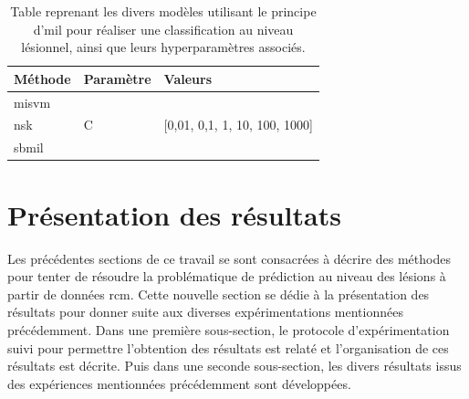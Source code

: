 \begin{table}[H]
    \centering
    \begin{tabular}{lll}
    \toprule
    \textbf{Méthode}    & \textbf{Paramètre}& \textbf{Valeurs}                                  \\ \midrule
    \gls{misvm}         & \multirow{3}{*}{C}& \multirow{3}{*}{[0,01, 0,1, 1, 10, 100, 1000]}    \\ \cline{1-1}
    \gls{nsk}           &                   &                                                   \\ \cline{1-1} 
    \gls{sbmil}         &                   &                                                   \\ \bottomrule 
    \end{tabular}    
    \caption{Table reprenant les divers modèles utilisant le principe d'\gls{mil} pour réaliser une classification au niveau lésionnel, ainsi que leurs hyperparamètres associés.}
    \label{tab:patient_decision_weak_hyperparameters}
\end{table}\par
\clearpage

\section{Présentation des résultats}
Les précédentes sections de ce travail se sont consacrées à décrire des méthodes pour tenter de résoudre la problématique de prédiction au niveau des lésions à partir de données \gls{rcm}. Cette nouvelle section se dédie à la présentation des résultats pour donner suite aux diverses expérimentations mentionnées précédemment. Dans une première sous-section, le protocole d'expérimentation suivi pour permettre l'obtention des résultats est relaté et l'organisation de ces résultats est décrite. Puis dans une seconde sous-section, les divers résultats issus des expériences mentionnées précédemment sont développées.\par

